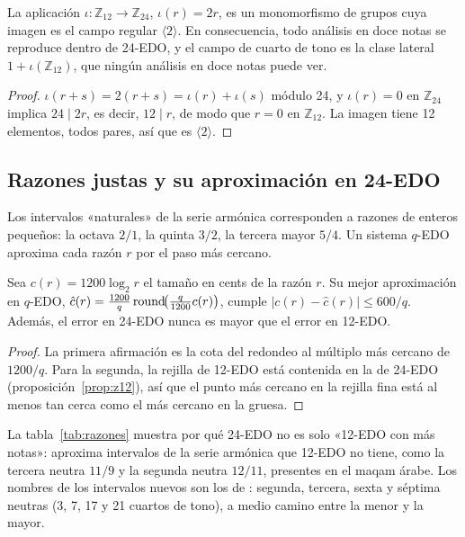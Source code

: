 \begin{proposicion}\label{prop:z12}
La aplicación $\iota : \mathbb{Z}_{12} \to \mathbb{Z}_{24}$, $\iota(r) = 2r$, es un monomorfismo de grupos cuya imagen es
el campo regular $\langle 2 \rangle$. En consecuencia, todo análisis en doce notas se reproduce dentro de 24-EDO, y el
campo de cuarto de tono es la clase lateral $1 + \iota(\mathbb{Z}_{12})$, que ningún análisis en doce notas puede ver.
\end{proposicion}

\begin{proof}
$\iota(r + s) = 2(r + s) = \iota(r) + \iota(s)$ módulo 24, y $\iota(r) = 0$ en $\mathbb{Z}_{24}$ implica $24 \mid 2r$, es
decir, $12 \mid r$, de modo que $r = 0$ en $\mathbb{Z}_{12}$. La imagen tiene 12 elementos, todos pares, así que es
$\langle 2 \rangle$.
\end{proof}

\subsection{Razones justas y su aproximación en 24-EDO}

Los intervalos «naturales» de la serie armónica corresponden a razones de enteros pequeños: la octava $2/1$, la quinta
$3/2$, la tercera mayor $5/4$. Un sistema $q$-EDO aproxima cada razón $r$ por el paso más cercano.

\begin{proposicion}
Sea $c(r) = 1200 \log_2 r$ el tamaño en cents de la razón $r$. Su mejor aproximación en $q$-EDO,
$\hat c(r) = \tfrac{1200}{q} \operatorname{round}\!\bigl(\tfrac{q}{1200} c(r)\bigr)$, cumple $|c(r) - \hat c(r)| \le 600/q$. Además,
el error en 24-EDO nunca es mayor que el error en 12-EDO.
\end{proposicion}

\begin{proof}
La primera afirmación es la cota del redondeo al múltiplo más cercano de $1200/q$. Para la segunda, la rejilla de 12-EDO
está contenida en la de 24-EDO (proposición~\ref{prop:z12}), así que el punto más cercano en la rejilla fina está al
menos tan cerca como el más cercano en la gruesa.
\end{proof}

La tabla~\ref{tab:razones} muestra por qué 24-EDO no es solo «12-EDO con más notas»: aproxima intervalos de la serie
armónica que 12-EDO no tiene, como la tercera neutra $11/9$ y la segunda neutra $12/11$, presentes en el maqam árabe. Los nombres de los
intervalos nuevos son los de \citet[§6, pp.~2--3]{wyschnegradsky2017}: segunda, tercera, sexta y séptima neutras (3, 7,
17 y 21 cuartos de tono), a medio camino entre la menor y la mayor.

